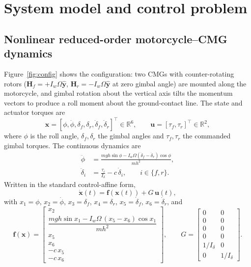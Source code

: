 \documentclass[preprint,12pt,authoryear=false]{elsarticle}
\theoremstyle{remark}\newtheorem{remark}{Remark}
\theoremstyle{plain}\newtheorem{proposition}{Proposition}\newtheorem{lemma}{Lemma}
\theoremstyle{definition}\newtheorem{assumption}{Assumption}
\begin{document}
\section{System model and control problem}
\subsection{Nonlinear reduced-order motorcycle--CMG dynamics}
Figure~\ref{fig:config} shows the configuration: two CMGs with counter-rotating rotors ($\bm H_f=+I_w\Omega\hat{\bm y}$, $\bm H_r=-I_w\Omega\hat{\bm y}$ at zero gimbal angle) are mounted along the motorcycle, and gimbal rotation about the vertical axis tilts the momentum vectors to produce a roll moment about the ground-contact line. The state and actuator torques are
\begin{equation}
\bm x=[\phi,\dot\phi,\delta_f,\delta_r,\dot\delta_f,\dot\delta_r]^\top\in\mathbb R^6,\qquad \bm u=[\tau_f,\tau_r]^\top\in\mathbb R^2,
\end{equation}
where $\phi$ is the roll angle, $\delta_f,\delta_r$ the gimbal angles and $\tau_f,\tau_r$ the commanded gimbal torques. The continuous dynamics are
\begin{align}
\ddot\phi&=\frac{mgh\sin\phi-I_w\Omega(\dot\delta_f-\dot\delta_r)\cos\phi}{mh^2},\label{eq:roll}\\
\ddot\delta_i&=\frac{\tau_i}{I_\delta}-c\,\dot\delta_i,\qquad i\in\{f,r\}.\label{eq:gimbal}
\end{align}
Written in the standard control-affine form,
\begin{equation}
\dot{\bm x}(t)=\bm f(\bm x(t))+G\,\bm u(t),\label{eq:affine}
\end{equation}
with $x_1=\phi$, $x_2=\dot\phi$, $x_3=\delta_f$, $x_4=\delta_r$, $x_5=\dot\delta_f$, $x_6=\dot\delta_r$, and
\begin{equation}
\bm f(\bm x)=\begin{bmatrix}x_2\\[2pt]\dfrac{mgh\sin x_1-I_w\Omega\,(x_5-x_6)\cos x_1}{mh^2}\\[6pt]x_5\\x_6\\-c\,x_5\\-c\,x_6\end{bmatrix},\qquad
G=\begin{bmatrix}0&0\\0&0\\0&0\\0&0\\1/I_\delta&0\\0&1/I_\delta\end{bmatrix}.\label{eq:fg}
\end{equation}
\end{document}
